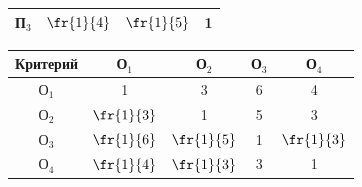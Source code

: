 \begin{table}
\begin{minipage}[b]{64mm}
\begin{center}
\begin{tabular}{|c|c|c|c|}
П$_3$&$\fr{1}{4}$&$\fr{1}{5}$&1\\

\hline

      \end{tabular}

      \end{center}


\end{minipage}


\hfill

 \begin{minipage}[b]{64mm}

      \begin{center}


      \vspace*{2ex}

      

      \tabcolsep=8.7pt

      \begin{tabular}{|c|c|c|c|c|}

      \hline

Критерий&О$_1$&О$_2$&О$_3$&О$_4$\\

\hline

О$_1$&1&3&6&4\\

О$_2$&$\fr{1}{3}$&1&5&3\\

О$_3$&$\fr{1}{6}$&$\fr{1}{5}$&1&$\fr{1}{3}$\\

О$_4$&$\fr{1}{4}$&$\fr{1}{3}$&3&1\\

\hline

      \end{tabular}






\end{center}
\end{minipage}
\end{table}
